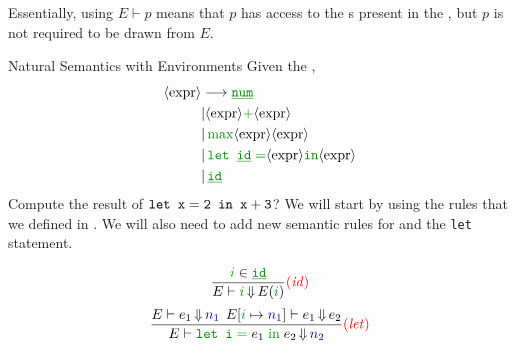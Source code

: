 Essentially, using $E \vdash p$ means that $p$ has access to the s present in the , but $p$ is not required to be drawn from $E$.

\begin{example}[Lecture 3]{Natural Semantics with Environments}
  Given the ,
  \begin{align*}
    \Nonterminal{expr} &\longrightarrow \SemanticInput{\underline{\mathtt{num}}} \\
                       &\vert \Nonterminal{expr} \SemanticInput{+} \Nonterminal{expr} \\
                       &\vert \, \SemanticInput{\mathtt{\max}} \Nonterminal{expr} \Nonterminal{expr} \\
                       &\vert \, \SemanticInput{\text{\texttt{let \underline{id}}} = } \Nonterminal{expr} \SemanticInput{\mathtt{in}} \Nonterminal{expr} \\
                       &\vert \, \SemanticInput{\mathtt{\underline{id}}}
  \end{align*}
  Compute the result of $\text{\texttt{let }} \mathtt{x = 2} \text{\texttt{ in }} \mathtt{x+3}$?
  \tcblower{}
  We will start by using the rules that we defined in .
  We will also need to add new semantic rules for  and the \texttt{let} statement.

  \begin{equation*}
    \frac{\SemanticInput{i} \in \SemanticInput{\mathtt{\underline{id}}}}{E \vdash \SemanticInput{i} \EvaluatesTo E(\SemanticInput{i})} \SemanticRuleName{id}
  \end{equation*}
  \begin{equation*}
    \frac{E \vdash e_{1} \EvaluatesTo \textcolor{Blue4}{n_{1}} \:\: E[\SemanticInput{i} \mapsto \textcolor{Blue4}{n_{1}}] \vdash e_{1} \EvaluatesTo e_{2}}{E \vdash \SemanticInput{\text{\texttt{let }}\mathtt{i =}} \; e_{1} \; \SemanticInput{\mathtt{\text{in}}} \; e_{2} \EvaluatesTo \textcolor{Blue4}{n_{2}}} \SemanticRuleName{let}
  \end{equation*}


\end{example}
